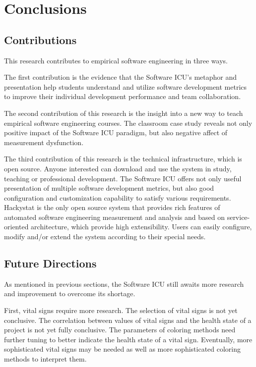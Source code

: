 \chapter{Conclusions}

\section{Contributions}
This research contributes to empirical software engineering in three ways.

The first contribution is the evidence that the Software ICU's metaphor and presentation help students understand and utilize software development metrics to improve their individual development performance and team collaboration.

The second contribution of this research is the insight into a new way to teach empirical software engineering courses. The classroom case study reveals not only positive impact of the Software ICU paradigm, but also negative affect of measurement dysfunction.

The third contribution of this research is the technical infrastructure, which is open source. Anyone interested can download and use the system in study, teaching or professional development. The Software ICU offers not only useful presentation of multiple software development metrics, but also good configuration and customization  capability to satisfy various requirements. Hackystat is the only open source system that provides rich features of automated software engineering measurement and analysis and based on service-oriented architecture, which provide high extensibility. Users can easily configure, modify and/or extend the system according to their special needs.


\section{Future Directions}
As mentioned in previous sections, the Software ICU still awaits more research and improvement to overcome its shortage.

First, vital signs require more research. The selection of vital signs is not yet conclusive. The correlation between values of vital signs and the health state of a project is not yet fully conclusive. The parameters of coloring methods need further tuning to better indicate the health state of a vital sign. Eventually, more sophisticated vital signs may be needed as well as more sophisticated coloring methods to interpret them. 

